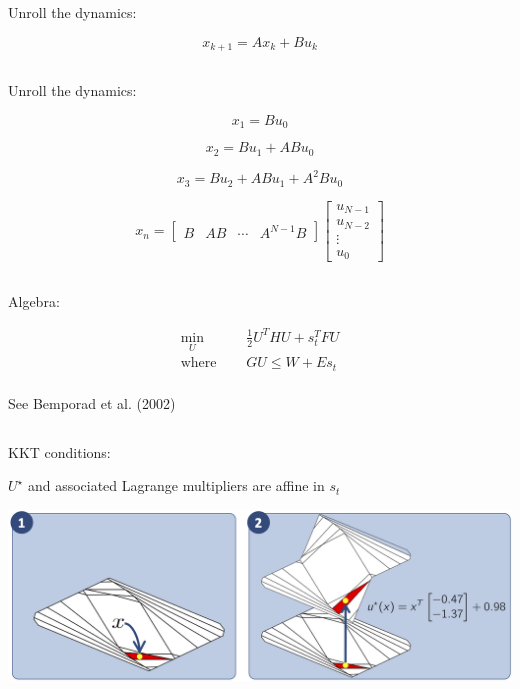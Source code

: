 \documentclass[
  letterpaper,
  DIV=11,
  numbers=noendperiod,
  oneside]{scrartcl}
\begin{document}
Unroll the dynamics:

\[x_{k+1} = A x_k + B u_k\]

\subsection{}\label{section-60}

Unroll the dynamics:

\[x_1 = B u_0\]

\[x_2 = B u_1 + A B u_0\]

\[x_3 = B u_2 + A B u_1 + A^2 B u_0\]

\[x_n =
\begin{bmatrix}
B & A B & \cdots & A^{N-1} B
\end{bmatrix}
\begin{bmatrix}
u_{N-1} \\ u_{N-2} \\ \vdots \\ u_0
\end{bmatrix}\]


\subsection{}\label{section-61}

Algebra:

\begin{align}
\min_{U} \quad & \frac{1}{2} U^T H U + s_t^T F U \\
\text{where } \quad & G U \leq W + E s_t \\
\end{align}

See Bemporad et al. (2002)

\subsection{}\label{section-62}

KKT conditions:

\(U^\star\) and associated Lagrange multipliers are affine in \(s_t\)

\includegraphics{figs/mpc_explicit.png}
\end{document}

